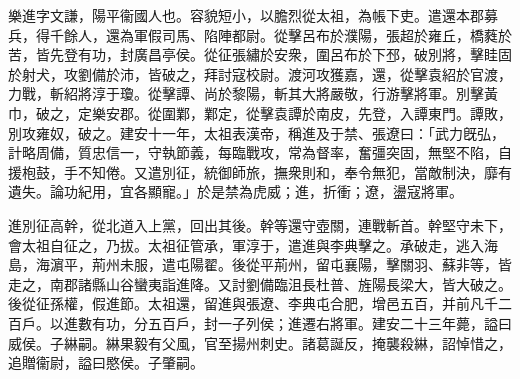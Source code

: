 
\begin{pinyinscope}
樂進字文謙，陽平衞國人也。容貌短小，以膽烈從太祖，為帳下吏。遣還本郡募兵，得千餘人，還為軍假司馬、陷陣都尉。從擊呂布於濮陽，張超於雍丘，橋蕤於苦，皆先登有功，封廣昌亭侯。從征張繡於安衆，圍呂布於下邳，破別將，擊眭固於射犬，攻劉備於沛，皆破之，拜討寇校尉。渡河攻獲嘉，還，從擊袁紹於官渡，力戰，斬紹將淳于瓊。從擊譚、尚於黎陽，斬其大將嚴敬，行游擊將軍。別擊黃巾，破之，定樂安郡。從圍鄴，鄴定，從擊袁譚於南皮，先登，入譚東門。譚敗，別攻雍奴，破之。建安十一年，太祖表漢帝，稱進及于禁、張遼曰：「武力旣弘，計略周備，質忠信一，守執節義，每臨戰攻，常為督率，奮彊突固，無堅不陷，自援枹鼓，手不知倦。又遣別征，統御師旅，撫衆則和，奉令無犯，當敵制決，靡有遺失。論功紀用，宜各顯寵。」於是禁為虎威；進，折衝；遼，盪寇將軍。

進別征高幹，從北道入上黨，回出其後。幹等還守壺關，連戰斬首。幹堅守未下，會太祖自征之，乃拔。太祖征管承，軍淳于，遣進與李典擊之。承破走，逃入海島，海濵平，荊州未服，遣屯陽翟。後從平荊州，留屯襄陽，擊關羽、蘇非等，皆走之，南郡諸縣山谷蠻夷詣進降。又討劉備臨沮長杜普、旌陽長梁大，皆大破之。後從征孫權，假進節。太祖還，留進與張遼、李典屯合肥，增邑五百，并前凡千二百戶。以進數有功，分五百戶，封一子列侯；進遷右將軍。建安二十三年薨，謚曰威侯。子綝嗣。綝果毅有父風，官至揚州刺史。諸葛誕反，掩襲殺綝，詔悼惜之，追贈衞尉，謚曰愍侯。子肇嗣。


\end{pinyinscope}